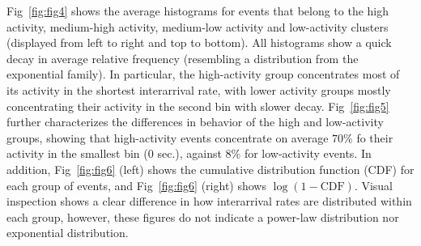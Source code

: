 \documentclass[10pt,letterpaper]{article}
\begin{document}




Fig~\ref{fig:fig4} shows the average histograms for events that
belong to the high activity, medium-high activity, medium-low activity
and low-activity clusters (displayed from left to right and top to
bottom). All histograms show a quick decay in average relative
frequency (resembling a distribution from the exponential family). In
particular, the high-activity group concentrates most of its activity
in the shortest interarrival rate, with lower activity groups mostly
concentrating their activity in the second bin with slower
decay. Fig~\ref{fig:fig5} further characterizes the differences in
behavior of the high and low-activity groups, showing that
high-activity events concentrate on average $70\%$ fo their activity
in the smallest bin ($0$ sec.), against $8\%$ for low-activity
events. In addition, Fig~\ref{fig:fig6} (left) shows the cumulative
distribution function (CDF) for each group of events, and
Fig~\ref{fig:fig6} (right) shows $\log{(1 - \mathrm{CDF})}$. Visual
inspection shows a clear difference in how interarrival rates are
distributed within each group, however, these figures do not indicate a
power-law distribution nor exponential distribution.%
\end{document}
